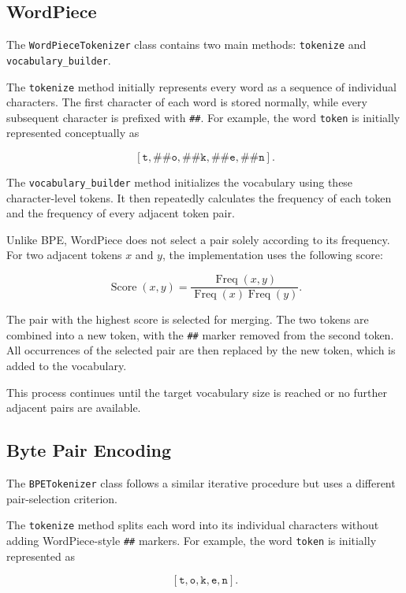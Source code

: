 \documentclass[sigconf]{acmart}
\begin{document}
\subsection{WordPiece}

The \texttt{WordPieceTokenizer} class contains two main methods:
\texttt{tokenize} and \texttt{vocabulary\_builder}.

The \texttt{tokenize} method initially represents every word as a
sequence of individual characters. The first character of each word is
stored normally, while every subsequent character is prefixed with
\texttt{\#\#}. For example, the word \texttt{token} is initially
represented conceptually as

\[
[\texttt{t},\texttt{\#\#o},\texttt{\#\#k},\texttt{\#\#e},
\texttt{\#\#n}].
\]

The \texttt{vocabulary\_builder} method initializes the vocabulary using
these character-level tokens. It then repeatedly calculates the
frequency of each token and the frequency of every adjacent token pair.

Unlike BPE, WordPiece does not select a pair solely according to its
frequency. For two adjacent tokens \(x\) and \(y\), the implementation
uses the following score:

\[
\operatorname{Score}(x,y)
=
\frac{\operatorname{Freq}(x,y)}
{\operatorname{Freq}(x)\operatorname{Freq}(y)}.
\]

The pair with the highest score is selected for merging. The two tokens
are combined into a new token, with the \texttt{\#\#} marker removed
from the second token. All occurrences of the selected pair are then
replaced by the new token, which is added to the vocabulary.

This process continues until the target vocabulary size is reached or
no further adjacent pairs are available.

\subsection{Byte Pair Encoding}

The \texttt{BPETokenizer} class follows a similar iterative procedure
but uses a different pair-selection criterion.

The \texttt{tokenize} method splits each word into its individual
characters without adding WordPiece-style \texttt{\#\#} markers. For
example, the word \texttt{token} is initially represented as

\[
[\texttt{t},\texttt{o},\texttt{k},\texttt{e},\texttt{n}].
\]
\end{document}
